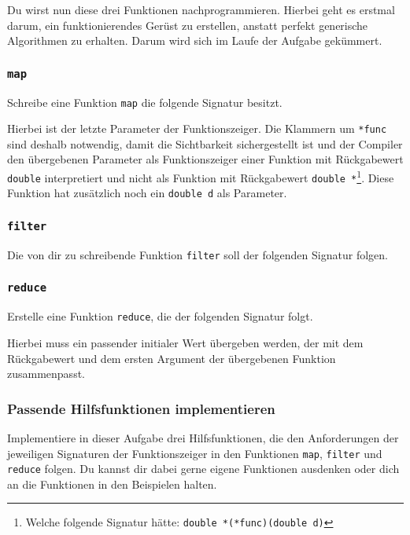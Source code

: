 Du wirst nun diese drei Funktionen nachprogrammieren.
Hierbei geht es erstmal darum, ein funktionierendes Gerüst zu erstellen, anstatt perfekt generische Algorithmen zu erhalten.
Darum wird sich im Laufe der Aufgabe gekümmert.

\subsubsection{\lstinline{map}}

Schreibe eine Funktion \lstinline{map} die folgende Signatur besitzt.


Hierbei ist der letzte Parameter der Funktionszeiger.
Die Klammern um \lstinline{*func} sind deshalb notwendig, damit die Sichtbarkeit sichergestellt ist und der Compiler den übergebenen Parameter als Funktionszeiger einer Funktion mit Rückgabewert \lstinline{double} interpretiert und nicht als Funktion mit Rückgabewert \lstinline{double *}\footnote{Welche folgende Signatur hätte: \lstinline{double *(*func)(double d)}}.
Diese Funktion hat zusätzlich noch ein \lstinline{double d} als Parameter.

\subsubsection{\lstinline{filter}}

Die von dir zu schreibende Funktion \lstinline{filter} soll der folgenden Signatur folgen.


\subsubsection{\lstinline{reduce}}

Erstelle eine Funktion \lstinline{reduce}, die der folgenden Signatur folgt.


Hierbei muss ein passender initialer Wert übergeben werden, der mit dem Rückgabewert und dem ersten Argument der übergebenen Funktion zusammenpasst.

\subsubsection{Passende Hilfsfunktionen implementieren}
Implementiere in dieser Aufgabe drei Hilfsfunktionen, die den Anforderungen der jeweiligen Signaturen der Funktionszeiger in den Funktionen \lstinline{map}, \lstinline{filter} und \lstinline{reduce} folgen.
Du kannst dir dabei gerne eigene Funktionen ausdenken oder dich an die Funktionen in den Beispielen halten. 

